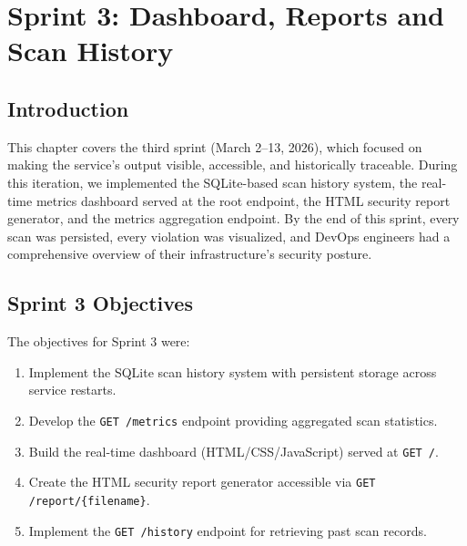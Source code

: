 
\chapter{Sprint 3: Dashboard, Reports and Scan History}

\section{Introduction}

This chapter covers the third sprint (March 2--13, 2026), which focused on making the service's output visible, accessible, and historically traceable. During this iteration, we implemented the SQLite-based scan history system, the real-time metrics dashboard served at the root endpoint, the HTML security report generator, and the metrics aggregation endpoint. By the end of this sprint, every scan was persisted, every violation was visualized, and DevOps engineers had a comprehensive overview of their infrastructure's security posture.

\section{Sprint 3 Objectives}

The objectives for Sprint 3 were:

\begin{enumerate}
    \item Implement the SQLite scan history system with persistent storage across service restarts.
    \item Develop the \texttt{GET /metrics} endpoint providing aggregated scan statistics.
    \item Build the real-time dashboard (HTML/CSS/JavaScript) served at \texttt{GET /}.
    \item Create the HTML security report generator accessible via \texttt{GET /report/\{filename\}}.
    \item Implement the \texttt{GET /history} endpoint for retrieving past scan records.
\end{enumerate}


